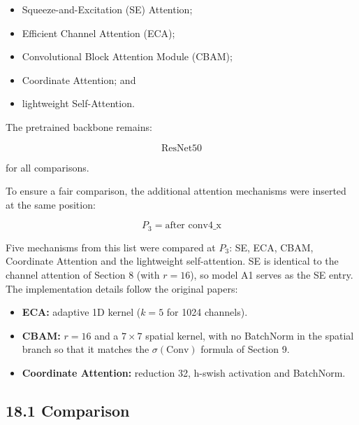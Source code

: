 \documentclass[10pt]{article}
\begin{document}
\begin{itemize}

\item Squeeze-and-Excitation (SE) Attention;

\item Efficient Channel Attention (ECA);

\item Convolutional Block Attention Module (CBAM);

\item Coordinate Attention; and

\item lightweight Self-Attention.

\end{itemize}

The pretrained backbone remains:

\[
\boxed{\text{ResNet50}}
\]

for all comparisons.

To ensure a fair comparison, the additional attention mechanisms were
inserted at the same position:

\[
\boxed{
P_3=\text{after conv4\_x}
}
\]

Five mechanisms from this list were compared at $P_3$: SE, ECA, CBAM,
Coordinate Attention and the lightweight self-attention. SE is identical to the
channel attention of Section 8 (with $r=16$), so model A1 serves as the SE
entry. The implementation details follow the original papers:
\begin{itemize}
\item \textbf{ECA:} adaptive 1D kernel ($k=5$ for 1024 channels).
\item \textbf{CBAM:} $r=16$ and a $7\times7$ spatial kernel, with no BatchNorm in
the spatial branch so that it matches the $\sigma(\mathrm{Conv})$ formula of Section 9.
\item \textbf{Coordinate Attention:} reduction 32, h-swish activation and BatchNorm.
\end{itemize}

\subsection*{18.1 Comparison}
\end{document}
